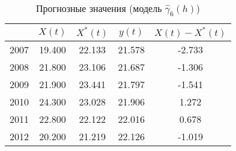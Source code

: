 \begin{table}[H]
\centering
\caption{Прогнозные значения (модель $ \widehat{\gamma}_6(h) $)} 
\label{table:per-fit-cv-prediction}
\begin{tabular}{r|cccc}
  \hline
 & $X(t)$ & $X^{*}(t)$ & $y(t)$ & $ X(t) - X^{*}(t) $ \\ 
  \hline
2007 & 19.400 & 22.133 & 21.578 & -2.733 \\ 
  2008 & 21.800 & 23.106 & 21.687 & -1.306 \\ 
  2009 & 21.900 & 23.441 & 21.797 & -1.541 \\ 
  2010 & 24.300 & 23.028 & 21.906 & 1.272 \\ 
  2011 & 22.800 & 22.122 & 22.016 & 0.678 \\ 
  2012 & 20.200 & 21.219 & 22.126 & -1.019 \\ 
   \hline
\end{tabular}
\end{table}
